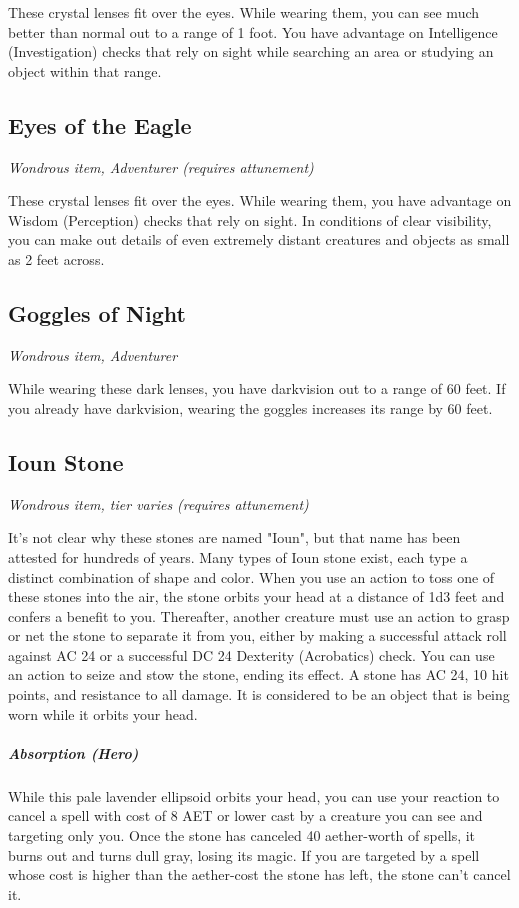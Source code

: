 These crystal lenses fit over the eyes. While wearing them, you can see much better than normal out to a range of 1 foot. You have advantage on Intelligence (Investigation) checks that rely on sight while searching an area or studying an object within that range.

\subsection{Eyes of the Eagle}
\textit{Wondrous item, Adventurer (requires attunement)}

These crystal lenses fit over the eyes. While wearing them, you have advantage on Wisdom (Perception) checks that rely on sight. In conditions of clear visibility, you can make out details of even extremely distant creatures and objects as small as 2 feet across.

\subsection{Goggles of Night}
\textit{Wondrous item, Adventurer} 

While wearing these dark lenses, you have darkvision out to a range of 60 feet. If you already have darkvision, wearing the goggles increases its range by 60 feet.

\subsection{Ioun Stone}
\textit{Wondrous item, tier varies (requires attunement)}

It's not clear why these stones are named "Ioun", but that name has been attested for hundreds of years. Many types of Ioun stone exist, each type a distinct combination of shape and color. When you use an action to toss one of these stones into the air, the stone orbits your head at a distance of 1d3 feet and confers a benefit to you. Thereafter, another creature must use an action to grasp or net the stone to separate it from you, either by making a successful attack roll against AC 24 or a successful DC 24 Dexterity (Acrobatics) check. You can use an action to seize and stow the stone, ending its effect.  A stone has AC 24, 10 hit points, and resistance to all damage. It is considered to be an object that is being worn while it orbits your head.

\subparagraph*{Absorption (Hero)} While this pale lavender ellipsoid orbits your head, you can use your reaction to cancel a spell with cost of 8 AET or lower cast by a creature you can see and targeting only you.  Once the stone has canceled 40 aether-worth of spells, it burns out and turns dull gray, losing its magic. If you are targeted by a spell whose cost is higher than the aether-cost the stone has left, the stone can't cancel it.

